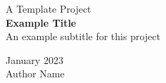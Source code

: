 \documentclass[a4paper,10pt]{report}
\newcommand\authorname{Author Name}
\begin{document}
\begin{titlepage}
    \centering
    \vspace*{3.5cm}
    \large{A Template Project}\\
    \huge\textbf{Example Title}\\
    \large{An example subtitle for this project}

    \vfill

    January 2023\\
    \vspace{.25cm}
    \Large\authorname 
    \vspace{4.5cm}
\end{titlepage}


% 
\end{document}
